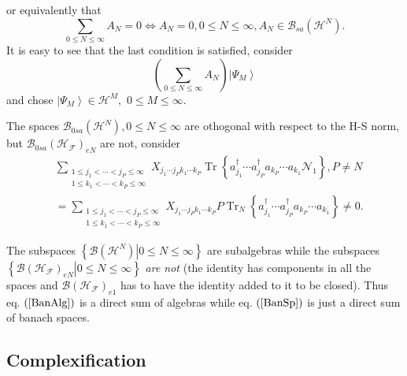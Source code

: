 \documentclass[aps,preprint]{revtex4}%
\begin{document}
or equivalently that
\begin{equation}
\sum_{0\leq N\leq\infty}A_{N}=0\Leftrightarrow A_{N}=0,0\leq N\leq\infty
,A_{N}\in\mathcal{B}_{sa}\left(  \mathcal{H}^{N}\right)  .
\end{equation}
It is easy to see that the last condition is satisfied, consider
\begin{equation}
\left(  \sum_{0\leq N\leq\infty}A_{N}\right)  \left\vert \Psi_{M}%
\right\rangle
\end{equation}
and chose $\left\vert \Psi_{M}\right\rangle \in\mathcal{H}^{M},$ $0\leq
M\leq\infty.$

The spaces $\mathcal{B}_{0sa}\left(  \mathcal{H}^{N}\right)  ,0\leq
N\leq\infty$ are othogonal with respect to the H-S norm, but $\mathcal{B}%
_{0sa}\left(  \mathcal{H}_{\mathcal{F}}\right)  _{eN}$ are not, consider%
\begin{align}
&  \sum_{\substack{1\leq j_{1}<\cdots<j_{P}\leq\infty\\1\leq k_{1}%
<\cdots<k_{P}\leq\infty}}X_{j_{1}\cdots j_{P}k_{1}\cdots k_{P}}%
\operatorname*{Tr}\left\{  a_{j_{1}}^{\dagger}\cdots a_{j_{P}}^{\dagger
}a_{k_{P}}\cdots a_{k_{1}}\mathcal{N}_{1}\right\}  ,P\neq N\nonumber\\
&  =\sum_{\substack{1\leq j_{1}<\cdots<j_{P}\leq\infty\\1\leq k_{1}%
<\cdots<k_{P}\leq\infty}}X_{j_{1}\cdots j_{P}k_{1}\cdots k_{P}}%
P\operatorname*{Tr}\nolimits_{N}\left\{  a_{j_{1}}^{\dagger}\cdots a_{j_{P}%
}^{\dagger}a_{k_{P}}\cdots a_{k_{1}}\right\}  \neq0.
\end{align}


The subspaces $\left\{  \left.  \mathcal{B}\left(  \mathcal{H}^{N}\right)
\right\vert 0\leq N\leq\infty\right\}  $ are subalgebras while the subspaces
$\left\{  \left.  \mathcal{B}\left(  \mathcal{H}_{\mathcal{F}}\right)
_{eN}\right\vert 0\leq N\leq\infty\right\}  $ \emph{are not }(the identity has
components in all the spaces and $\mathcal{B}\left(  \mathcal{H}_{\mathcal{F}%
}\right)  _{e1}$ has to have the identity added to it to be closed). Thus eq.
$\left(  \ref{BanAlg}\right)  $ is a direct sum of algebras while eq. $\left(
\ref{BanSp}\right)  $ is just a direct sum of banach spaces.

\subsection{Complexification}
\end{document}
